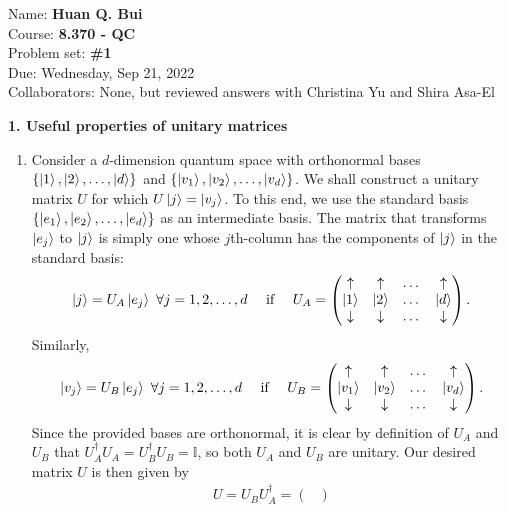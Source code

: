 \documentclass{article}
\theoremstyle{definition}
\begin{document}
\begin{framed}
\noindent Name: \textbf{Huan Q. Bui}\\
Course: \textbf{8.370 - QC}\\
Problem set: \textbf{\#1}\\
Due: Wednesday, Sep 21, 2022\\
Collaborators: None, but reviewed answers with Christina Yu and Shira Asa-El
\end{framed}


\noindent \textbf{1. Useful properties of unitary matrices }

\begin{enumerate}[label=(\alph*)]
	\item Consider a $d$-dimension quantum space with orthonormal bases $\{ \ket{1}, \ket{2}, \dots, \ket{d}\}$ and $\{\ket{v_1}, \ket{v_2}, \dots, \ket{v_d}\}$. We shall construct a unitary matrix $U$ for which $U\ket{j} = \ket{v_j}$. To this end, we use the standard basis $\{ \ket{e_1}, \ket{e_2},\dots, \ket{e_d}\}$ as an intermediate basis. The matrix that transforms $\ket{e_j}$ to $\ket{j}$ is simply one whose $j$th-column has the components of $\ket{j}$ in the standard basis:
	\begin{align*}
		\ket{j} = U_A \ket{e_j} \,\, \forall j=1,2,\dots,d \quad \text{ if } \quad U_A = \begin{pmatrix}
			\uparrow & \uparrow& \dots & \uparrow\\
			\ket{1}& \ket{2}& \dots & \ket{d}\\
			\downarrow& \downarrow& \dots&\downarrow 
		\end{pmatrix}.
	\end{align*}
	Similarly, 
	\begin{align*}
		\ket{v_j} = U_B \ket{e_j} \,\, \forall j=1,2,\dots,d \quad \text{ if } \quad U_B = \begin{pmatrix}
			\uparrow & \uparrow& \dots & \uparrow\\
			\ket{v_1}& \ket{v_2}& \dots & \ket{v_d}\\
			\downarrow& \downarrow& \dots&\downarrow 
		\end{pmatrix}.
	\end{align*}
	Since the provided bases are orthonormal, it is clear by definition of $U_A$ and $U_B$ that $U_A^\dagger U_A = U_B^\dagger U_B = \mathbb{I}$, so both $U_A$ and $U_B$ are unitary. Our desired matrix $U$ is then given by 
	\begin{align*}
		U = U_B U_A^\dagger =  \begin{pmatrix}

\end{pmatrix}
\end{align*}
\end{enumerate}
\end{document}
